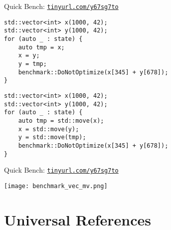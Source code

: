 \begin{frame}[fragile]{Quick Bench: \href{http://quick-bench.com/7qTMMYSgUJG-lRg-B26ZX77vim0}{\texttt{tinyurl.com/y67sg7to}}}
    \begin{lstlisting}
std::vector<int> x(1000, 42);
std::vector<int> y(1000, 42);
for (auto _ : state) {
    auto tmp = x;
    x = y;
    y = tmp;
    benchmark::DoNotOptimize(x[345] + y[678]);
}
    \end{lstlisting}

    \begin{lstlisting}
std::vector<int> x(1000, 42);
std::vector<int> y(1000, 42);
for (auto _ : state) {
    auto tmp = std::move(x);
    x = std::move(y);
    y = std::move(tmp);
    benchmark::DoNotOptimize(x[345] + y[678]);
}
    \end{lstlisting}
\end{frame}

\begin{frame}{Quick Bench: \href{http://quick-bench.com/7qTMMYSgUJG-lRg-B26ZX77vim0}{\texttt{tinyurl.com/y67sg7to}}}
    \centering

    \texttt{[image: benchmark\_vec\_mv.png]}
\end{frame}

\begin{frame}
    \centering
    \scalebox{3}{Universal References}
\end{frame}

\section{Universal References}

